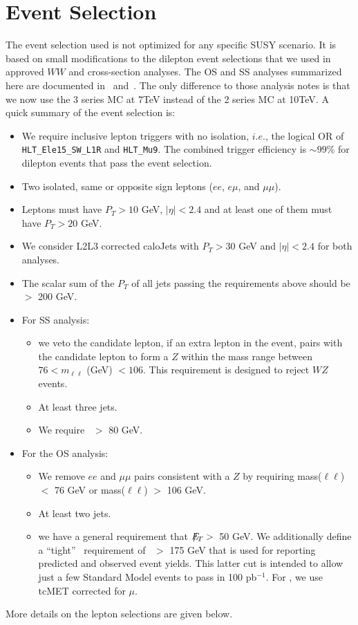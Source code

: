\section{Event Selection}
\label{sec:eventselection}

The event selection used is not optimized for any specific SUSY
scenario. It is based on small modifications to the dilepton event
selections  that we used in approved $WW$\cite{ww} and
\ttbar\cite{ttbar} cross-section analyses.  The OS and SS analyses
summarized here are documented in~\cite{osnote} and~\cite{ssnote}. The
only difference to those analysis notes is that we now use the 3
series MC at 7TeV instead of the 2 series MC at 10TeV.  
A quick summary of the event selection is:

\begin{itemize}
\item We require inclusive lepton triggers with no isolation, $i.e.$, the
  logical OR of {\tt HLT\_Ele15\_SW\_L1R} and {\tt HLT\_Mu9}. 
  The combined trigger efficiency is $\sim 99$\% for dilepton events that pass the event selection.
\item Two isolated, same or opposite sign leptons ($ee$, $e\mu$, and $\mu\mu$). 
\item Leptons must have $P_T > 10$ GeV, $|\eta|< 2.4$ and at least one of them must have $P_T > 20$ GeV.
\item We consider L2L3 corrected caloJets with $P_T > 30$ GeV and
	$|\eta|< 2.4$ for both analyses. 
\item The scalar sum of the $P_T$ of all jets passing the requirements above should be $>$ 200 GeV.
\item For SS analysis:
\begin{itemize}
      \item  we veto the candidate lepton, if an extra lepton in the event, pairs with the candidate lepton
             to form a $Z$ within the mass range between $76 < m_{\ell\ell} $ (GeV) $< 106$. This requirement is 
             designed to reject $WZ$ events.
      \item At least three jets.
      \item We require \met~$>$ 80 GeV.
\end{itemize}
\item For the OS analysis: 
\begin{itemize}
      \item We remove $ee$ and $\mu\mu$ pairs consistent with a $Z$ by requiring mass($\ell\ell$) $<$ 76 GeV or mass($\ell\ell$) $>$ 106 GeV.
      \item At least two jets.
      \item we have a general requirement that $E\!\!\!\!/_T>$~50 GeV. We additionally define a ``tight'' \met~requirement of \met~$>$ 175 GeV
	that is used for reporting predicted and observed event yields.
	This latter cut is intended to allow just a few Standard Model events to
	pass in 100 pb$^{-1}$.  For \met, we use tcMET \cite{tcmet}
	corrected for $\mu$.
\end{itemize}
\end{itemize}
\noindent More details on the lepton %
selections are given below.

